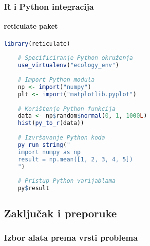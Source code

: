 \documentclass[11pt,oneside]{book}
\begin{document}
\subsubsection{R i Python integracija}

\paragraph{reticulate paket}

\begin{lstlisting}[language=R, caption=Pozivanje Python-a iz R-a]
	library(reticulate)
	
	# Specificiranje Python okruženja
	use_virtualenv("ecology_env")
	
	# Import Python modula
	np <- import("numpy")
	plt <- import("matplotlib.pyplot")
	
	# Korištenje Python funkcija
	data <- np$random$normal(0, 1, 1000L)
	hist(py_to_r(data))
	
	# Izvršavanje Python koda
	py_run_string("
	import numpy as np
	result = np.mean([1, 2, 3, 4, 5])
	")
	
	# Pristup Python varijablama
	py$result
\end{lstlisting}

\subsection{Zaključak i preporuke}

\subsubsection{Izbor alata prema vrsti problema}

\end{document}
